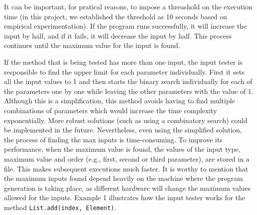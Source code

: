 It can be important, for pratical reasons, to impose a threashold on the execution time (in this project, we established the threshold as 10 seconds based on empirical experimentation). If the program runs successfully, it will increase the input by half, and if it fails, it will decrease the input by half. This process continues until the maximum value for the input is found.

If the method that is being tested has more than one input, the input tester is responsible to find the upper limit for each parameter individually. First it sets all the input values to 1 and then starts the binary search individually for each of the parameters one by one while leaving the other parameters with the value of 1. Although this is a simplification, this method avoids having to find multiple combinations of parameters which would increase the time complexity exponentially. More robust solutions (such as using a combinatory search) could be implemented in the future. Nevertheless, even using the simplified solution, the process of finding the max inputs is time-consuming. To improve its performance, when the maximum value is found, the values of the input type, maximum value and order (e.g., first, second or third parameter), are stored in a file. This makes subsequent executions much faster. It is worthy to mention that the maximum inputs found depend heavily on the machine where the program generation is taking place, as different hardware will change the maximum values allowed for the inputs. Example 1 illustrates how the input tester works for the method \texttt{List.add(index, Element)}.

